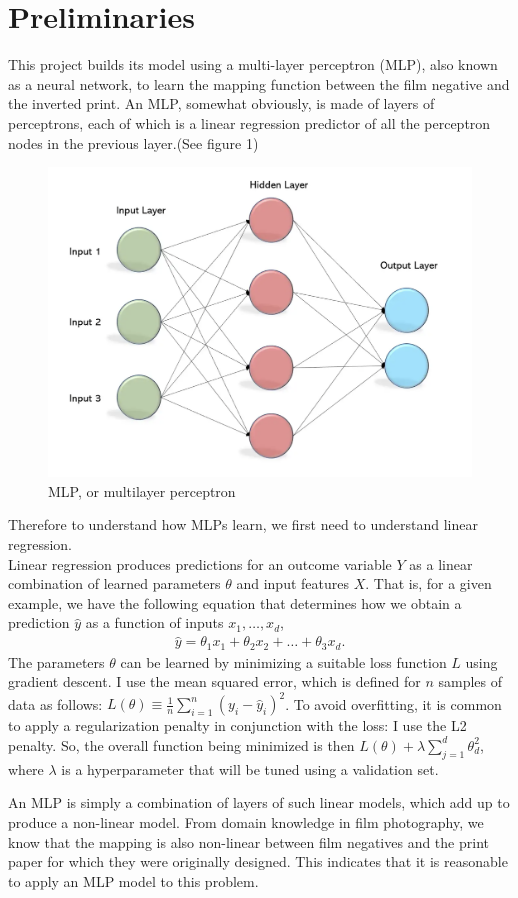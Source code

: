 \documentclass[twoside,11pt]{article}
\begin{document}
\section{Preliminaries}
\label{sec:prelims}
This project builds its model using a multi-layer perceptron (MLP), also known as a neural network, to learn the mapping function between 
the film negative and the inverted print. An MLP, somewhat obviously, is made of layers of perceptrons, 
each of which is a linear regression predictor of all the perceptron nodes in the previous layer.(See figure 1)\\
\begin{figure}
	\centering
	\includegraphics[width=0.5\linewidth]{mlp.png}
	\caption{MLP, or multilayer perceptron}
	\label{fig:MLP}
\end{figure}

Therefore to understand how MLPs learn, we first need to understand linear regression.\\
Linear regression produces predictions for an outcome variable $Y$ as a linear combination of learned parameters $\theta$ and input features $X$. That is, for a given example, we have the following equation that determines how we obtain a prediction $\widehat{y}$ as a function of inputs $x_1, \dots, x_d$,
	\begin{align*}
		\widehat{y} = \theta_1 x_1 + \theta_2 x_2 + \dots + \theta_3 x_d.
	\end{align*}	
	The parameters $\theta$ can be learned by minimizing a suitable loss function $L$ using gradient descent. I  use the mean squared error, which is defined for $n$ samples of data as follows: $L(\theta) \equiv \frac{1}{n} \sum_{i=1}^{n}(y_i - \widehat{y}_i)^2$. To avoid overfitting, it is common to apply a regularization penalty in conjunction with the loss: I use the L2 penalty. So, the overall function being minimized is then $L(\theta) + \lambda \sum_{j=1}^d \theta_d^2$, where $\lambda$ is a hyperparameter that will be tuned using a validation set.

An MLP is simply a combination of layers of such linear models, which add up to produce a non-linear model. 
From domain knowledge in film photography, we know that the mapping is also non-linear between film negatives and the print paper for which they were originally designed.
This indicates that it is reasonable to apply an MLP model to this problem.
\end{document}
